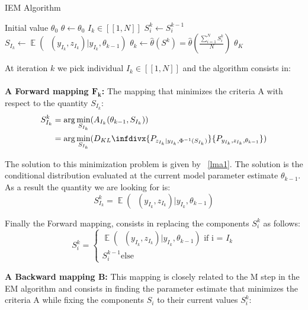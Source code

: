 \documentclass{article}
\theoremstyle{plain}
\DeclareMathOperator*{\E}{\mathbb{E}}
\DeclareMathOperator*{\St}{\tilde{S}}
\theoremstyle{plain}
\theoremstyle{definition}
\newcommand{\infdiv}{D_{KL}\infdivx}
\begin{document}
\begin{algorithm}
\caption{IEM Algorithm}
\label{pseudoIEM}
\begin{algorithmic}[1]
\State Initial value $\theta_0$
\State $\theta \gets \theta_0$
\State $I_{k} \in [\![1,N]\!]$
      \State $S_i^k \gets S_i^{k-1}$
       \Else
                \State $S_{I_{k}} \gets \E(\St(y_{I_{k}},z_{I_{k}})|y_{I_{k}},\theta_{k-1})$
        \EndIf
      \State $\theta_{k} \gets \hat{\theta}(S^{k}) = \hat{\theta}(\frac{\sum_{i=1}^{N}{S^{k}_i}}{N})$
\EndFor  
\State \Return $\theta_K$
\end{algorithmic}
\end{algorithm}
\newpage
\noindent At iteration $k$ we pick individual $I_{k} \in [\![1,N]\!]$ and the algorithm consists in:\\
\\
\textbf{A Forward mapping $\mathbf{F_{k}}$:} The mapping that minimizes the criteria A with respect to the quantity $S_{I_{k}}$:
\begin{equation}
\begin{split}
S_{I_{k}}^k  & = \arg \min \limits_{S_{I_{k}}} (A_{I_{k}}(\theta_{k-1}, S_{I_{k}}))\\
& = \arg \min \limits_{S_{I_{k}}}  (\infdiv{P_{z_{I_{k}}|y_{I_{k}},\Phi^{-1}(S_{I_{k}})}}{P_{y_{I_{k}},z_{I_{k}},\theta_{k-1}}})
\end{split}
\end{equation}

The solution to this minimization problem is given by ~\cref{lma1}. The solution is the conditional distribution evaluated at the current model parameter estimate $\theta_{k-1}$. As a result the quantity we are looking for is:
\begin{equation}
S_{I_{k}}^k = \E(\St(y_{I_{k}},z_{I_{k}})|y_{I_{k}},\theta_{k-1})
\end{equation}

Finally the Forward mapping, consists in replacing the components $S_i^k$ as follows:
\begin{equation}
S_i^{k} = \left\{
    \begin{array}{ll}
       \E(\St(y_{I_{k}},z_{I_{k}})|y_{I_{k}},\theta_{k-1}) \text{ if i = $I_{k}$}\\
        S^{k-1}_i \text{else}
    \end{array}
\right.
\end{equation}



\noindent \textbf{A Backward mapping B:} This mapping is closely related to the M step in the EM algorithm and consists in finding the parameter estimate that minimizes the criteria A while fixing the components $S_i$ to their current values $S_i^k$:
\end{document}
